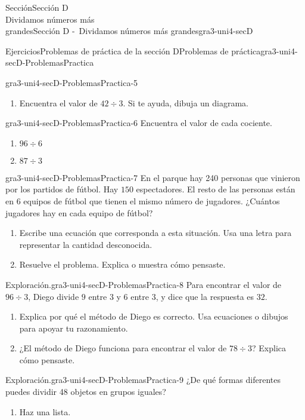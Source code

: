 \begin{sectionptx}{Sección}{{\Large Sección D\\}Dividamos números más\\grandes}{}{Sección D -~Dividamos números más grandes}{}{}{gra3-uni4-secD}
\begin{exercises-subsection}{Ejercicios}{Problemas de práctica de la sección D}{}{Problemas de práctica}{}{}{gra3-uni4-secD-ProblemasPractica}
\begin{divisionexercise}{3}{}{}{gra3-uni4-secD-ProblemasPractica-5}
\begin{enumerate}[label={(\alph*)}]
\item{}Encuentra el valor de \(42 \div 3\). Si te ayuda, dibuja un diagrama.%
\end{enumerate}
\end{divisionexercise}%
\begin{divisionexercise}{4}{}{}{gra3-uni4-secD-ProblemasPractica-6}%
Encuentra el valor de cada cociente.%
%
\begin{enumerate}[label={(\alph*)}]
\item{}\(\displaystyle 96 \div 6\)%
\item{}\(\displaystyle 87 \div 3\)%
\end{enumerate}
\end{divisionexercise}%
\begin{divisionexercise}{5}{}{}{gra3-uni4-secD-ProblemasPractica-7}%
En el parque hay 240 personas que vinieron por los partidos de fútbol. Hay \(150\) espectadores. El resto de las personas están en \(6\) equipos de fútbol que tienen el mismo número de jugadores. ¿Cuántos jugadores hay en cada equipo de fútbol?%
%
\begin{enumerate}[label={(\alph*)}]
\item{}Escribe una ecuación que corresponda a esta situación. Usa una letra para representar la cantidad desconocida.%
\item{}Resuelve el problema. Explica o muestra cómo pensaste.%
\end{enumerate}
\end{divisionexercise}%
\begin{divisionexercise}{6}{Exploración.}{}{gra3-uni4-secD-ProblemasPractica-8}%
Para encontrar el valor de \(96 \div 3\), Diego divide \(9\) entre \(3\) y \(6\) entre \(3\), y dice que la respuesta es \(32\).%
%
\begin{enumerate}[label={(\alph*)}]
\item{}Explica por qué el método de Diego es correcto. Usa ecuaciones o dibujos para apoyar tu razonamiento.%
\item{}¿El método de Diego funciona para encontrar el valor de \(78 \div 3\)? Explica cómo pensaste.%
\end{enumerate}
\end{divisionexercise}%
\begin{divisionexercise}{7}{Exploración.}{}{gra3-uni4-secD-ProblemasPractica-9}%
¿De qué formas diferentes puedes dividir 48 objetos en grupos iguales?%
%
\begin{enumerate}[label={(\alph*)}]
\item{}Haz una lista.%

\end{enumerate}
\end{divisionexercise}
\end{exercises-subsection}
\end{sectionptx}
